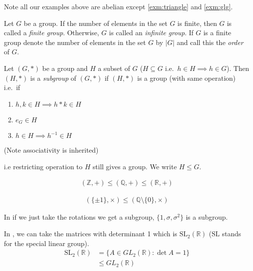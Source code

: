 Note all our examples above are abelian except \ref{exm:triangle} and \ref{exm:glg}.

\begin{definition}
Let \(G\) be a group. If the number of elements in the set \(G\) is finite, then \(G\) is called a \emph{finite group}. Otherwise, \(G\) is called an \emph{infinite group}. If \(G\) is a finite group denote the number of elements in the set \(G\) by \(|G|\) and call this the \emph{order} of \(G\).
\end{definition}

\begin{definition}[Subgroup]
Let \((G, *)\) be a group and \(H\) a subset of \(G\) (\(H \subseteq G\) i.e.~\(h \in H \implies h \in G\)). Then \((H, *)\) is a \emph{subgroup} of \((G, *)\) if \((H, *)\) is a group (with same operation) i.e.~if

\begin{enumerate}
\def\labelenumi{\alph{enumi})}
\item
  \(h, k \in H \implies h * k \in H\)
\item
  \(e_G \in H\)
\item
  \(h \in H \implies h^{-1} \in H\)
\end{enumerate}

(Note associativity is inherited)

i.e restricting operation to \(H\) still gives a group. We write \(H \leq G\).
\end{definition}

\begin{example}
\begin{align*}
    (\mathbb{Z}, +) \leq (\mathbb{Q}, +) \leq (\mathbb{R}, +)
\end{align*}
\end{example}

\begin{example}
\begin{align*}
    (\{\pm 1\}, \times) \leq (\mathbb{Q} \setminus \{ 0 \}, \times) 
\end{align*}
\end{example}

\begin{example}
In  if we just take the rotations we get a subgroup, \(\{ 1, \sigma, \sigma^2 \}\) is a subgroup.
\end{example}

\begin{example}
\protect\hypertarget{exm:sltwo}{}\label{exm:sltwo}
In , we can take the matrices with determinant 1 which is \(\mathrm{SL}_2(\mathbb{R})\) (\(\mathrm{SL}\) stands for the special linear group).
\begin{align*}
  \mathrm{SL}_2(\mathbb{R}) &= \{ A \in GL_2(\mathbb{R}) : \det A = 1 \} \\
    &\leq GL_2(\mathbb{R})
\end{align*}
\end{example}

